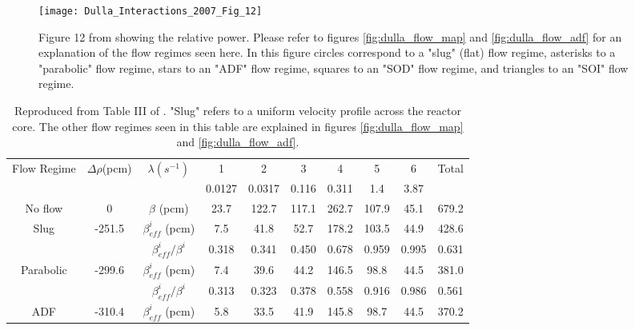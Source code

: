 \documentclass[review]{elsarticle}
\begin{document}
\begin{figure}[h]
   \centering
   \texttt{[image: Dulla\_Interactions\_2007\_Fig\_12]}
   \caption{Figure 12 from \cite{dulla_interactions_2007} showing the relative power. Please refer to
   figures \ref{fig:dulla_flow_map} and \ref{fig:dulla_flow_adf} for an
   explanation of the flow regimes seen here. In this figure circles correspond
   to a "slug" (flat) flow regime, asterisks to a "parabolic" flow regime, stars to an
   "ADF" flow regime, squares to an "SOD" flow regime, and triangles to an
   "SOI" flow regime.} 
   \label{fig:dulla_flow_regimes}
\end{figure}

\begin{table}[h]
    \caption{Reproduced from Table III of \cite{dulla_interactions_2007}. "Slug"
        refers to a uniform velocity profile across the reactor core.
        The other flow regimes seen in this table are explained in
        figures \ref{fig:dulla_flow_map} and \ref{fig:dulla_flow_adf}.} 
    \label{tbl:dulla_flow_regimes_beta}
    \begin{center}
        \begin{tabular}{|c|c|c|c|c|c|c|c|c|c|}
            \hline
            \multirow{2}{*}{Flow Regime} & \multirow{2}{*}{$\Delta \rho$(pcm)}
            &\multirow{2}{*}{$\lambda(s^{-1})$}&1 & 2 & 3 & 4 & 5 & 6 &
             \multirow{2}{*}{Total} \\
            \cline{4 - 9}
            & & & 0.0127 & 0.0317 & 0.116 & 0.311 & 1.4 & 3.87 & \\
            \hline
            No flow & 0 & $\beta$ (pcm) & 23.7 & 122.7 & 117.1 & 262.7 & 107.9 &
                45.1 & 679.2 \\
            \hline
            Slug & -251.5 & $\beta_{eff}^{i}$ (pcm) & 7.5 & 41.8 & 52.7 & 178.2&
                 103.5 & 44.9 & 428.6 \\
            & & $\beta_{eff}^{i}/\beta^{i}$ & 0.318 & 0.341 & 0.450 & 0.678 &
                0.959 & 0.995 & 0.631 \\
            \hline
            Parabolic & -299.6 & $\beta_{eff}^{i}$ (pcm) & 7.4 & 39.6 & 44.2 &
                146.5 & 98.8 & 44.5 & 381.0 \\
            & & $\beta_{eff}^{i}/\beta^{i}$ & 0.313 & 0.323 & 0.378 & 0.558 &
                0.916 & 0.986 & 0.561 \\
            \hline
            ADF & -310.4 & $\beta_{eff}^{i}$ (pcm) & 5.8 & 33.5 & 41.9 & 145.8 &
                 98.7 & 44.5 & 370.2 \\

\end{tabular}
\end{center}
\end{table}
\end{document}
